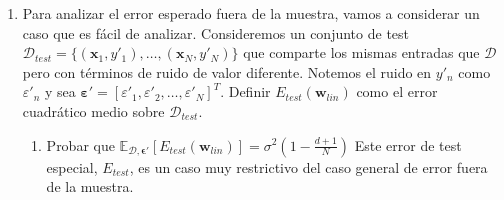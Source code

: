 \documentclass[11pt,leqno]{article}
\theoremstyle{definition}
\begin{document}
\begin{cuestion}
\begin{enumerate}[a]
        
        \item Para analizar el error esperado fuera de la muestra, vamos a considerar un caso que es fácil de analizar. 
        Consideremos un conjunto de test $\mathcal{D}_{test} = \{ (\mathbf{x}_1, y\prime_1), \dots, (\mathbf{x}_N, y\prime_N) \}$  
        que comparte los mismas entradas que $\mathcal{D}$ pero con  términos de ruido de valor diferente. 
        Notemos el ruido en $y\prime_n$ como $\varepsilon\prime_n$ y sea  $\mathbf{\varepsilon\prime} = [\varepsilon\prime_1,\varepsilon\prime_2, \dots, \varepsilon\prime_N]^T$. 
        Definir $E_{test}(\mathbf{w}_{lin})$ como el error cuadrático medio sobre $\mathcal{D}_{test}$.
        \begin{enumerate}
            \item Probar que $\mathbb{E}_{\mathcal{D},\mathbf{\epsilon\prime}}[E_{test}(\mathbf{w}_{lin})] = \sigma^2 \left(1 - \frac{d+1}{N} \right)$
            Este error de test especial, $E_{test}$, es un caso muy restrictivo del caso general de error fuera de la muestra.
        \end{enumerate}
    \end{enumerate}
\end{cuestion}
\end{document}
